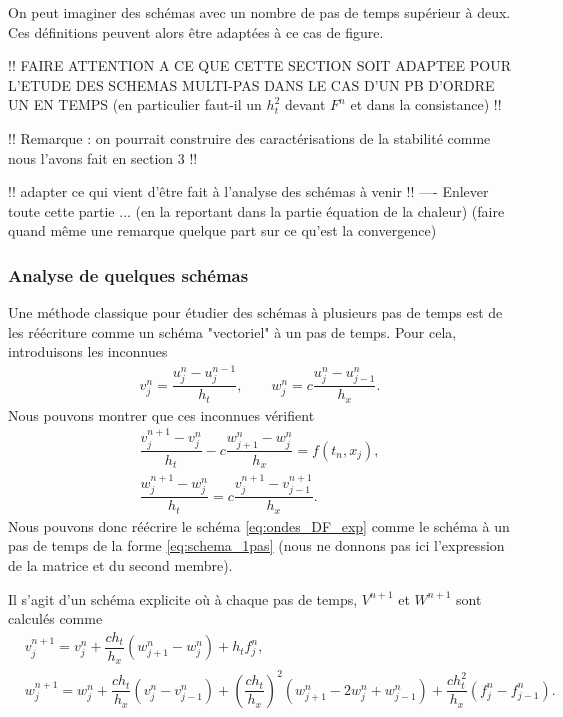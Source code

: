 \documentclass[12pt,a4paper,twoside]{article}
\begin{document}
\begin{remark}
  On peut imaginer des sch\'emas avec un nombre de pas de temps sup\'erieur \`a deux.
  Ces d\'efinitions peuvent alors \^etre adapt\'ees \`a ce cas de figure.
\end{remark}


!! FAIRE ATTENTION A CE QUE CETTE SECTION SOIT ADAPTEE POUR L'ETUDE DES SCHEMAS
MULTI-PAS DANS LE CAS D'UN PB D'ORDRE UN EN TEMPS 
(en particulier faut-il un $h_t^2$ devant $F^n$ et dans la consistance) !!


!! Remarque : on pourrait construire des caract\'erisations de la stabilit\'e comme
nous l'avons fait en section 3 !!


!! adapter ce qui vient d'\^etre fait \`a l'analyse des sch\'emas \`a venir !!
---- Enlever toute cette partie ... 
(en la reportant dans la partie \'equation de la chaleur)
(faire quand m\^eme une remarque quelque part sur ce qu'est la convergence)

\subsubsection{Analyse de quelques sch\'emas}



Une m\'ethode classique pour \'etudier des sch\'emas \`a plusieurs pas de temps est
de les r\'e\'ecriture comme un sch\'ema "vectoriel" \`a un pas de temps.
Pour cela, introduisons les inconnues 
\begin{align}
  v_j^n = \dfrac{u_j^n - u_j^{n-1}}{h_t} , \qquad w_j^n = c \dfrac{u_j^n - u_{j-1}^n}{h_x} .
\end{align}
Nous pouvons montrer que ces inconnues v\'erifient
\begin{align}
  \dfrac{v_j^{n+1} - v_j^n}{h_t} - c \dfrac{w_{j+1}^n - w_j^n}{h_x} = f(t_n,x_j) ,
  \\
  \dfrac{w_j^{n+1} - w_j^n}{h_t} = c \dfrac{v_j^{n+1} - v_{j-1}^{n+1}}{h_x} .
\end{align}
Nous pouvons donc r\'e\'ecrire le sch\'ema \eqref{eq:ondes_DF_exp}
comme le sch\'ema \`a un pas de temps de la forme \eqref{eq:schema_1pas}
(nous ne donnons pas ici l'expression de la matrice et du second membre).

Il s'agit d'un sch\'ema explicite o\`u \`a chaque pas de temps,
$V^{n+1}$ et $W^{n+1}$ sont calcul\'es comme
\begin{align*}
  &v_j^{n+1} = v_j^n + \dfrac{c h_t}{h_x} ( w_{j+1}^n - w_j^n ) + h_t f_j^n ,
  \\
  &w_j^{n+1} = w_j^n + \dfrac{c h_t}{h_x} ( v_j^n - v_{j-1}^n ) 
  + \left( \dfrac{c h_t}{h_x} \right)^2 (w_{j+1}^n - 2 w_j^n + w_{j-1}^n ) 
  + \dfrac{c h_t^2}{h_x} (f_j^n - f_{j-1}^n ) . 
\end{align*}
\end{document}
